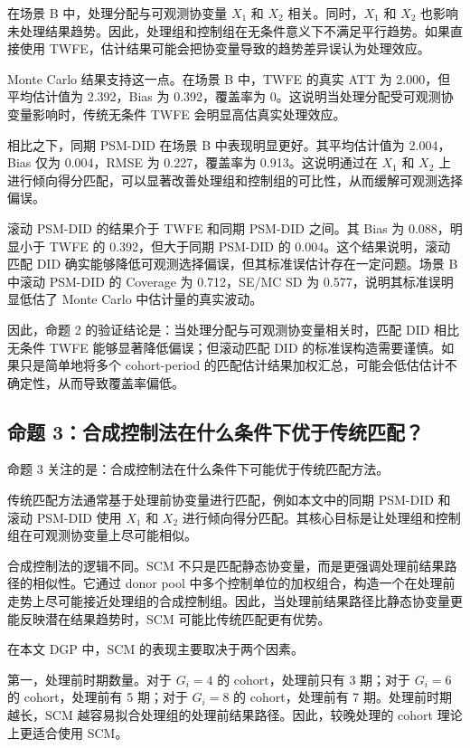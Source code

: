 \documentclass[
  fontset=windows]{ctexart}
\begin{document}
在场景 B 中，处理分配与可观测协变量 \(X_1\) 和 \(X_2\)
相关。同时，\(X_1\) 和 \(X_2\)
也影响未处理结果趋势。因此，处理组和控制组在无条件意义下不满足平行趋势。如果直接使用
TWFE，估计结果可能会把协变量导致的趋势差异误认为处理效应。

Monte Carlo 结果支持这一点。在场景 B 中，TWFE 的真实 ATT 为
2.000，但平均估计值为 2.392，Bias 为 0.392，覆盖率为
0。这说明当处理分配受可观测协变量影响时，传统无条件 TWFE
会明显高估真实处理效应。

相比之下，同期 PSM-DID 在场景 B 中表现明显更好。其平均估计值为
2.004，Bias 仅为 0.004，RMSE 为 0.227，覆盖率为 0.913。这说明通过在
\(X_1\) 和 \(X_2\)
上进行倾向得分匹配，可以显著改善处理组和控制组的可比性，从而缓解可观测选择偏误。

滚动 PSM-DID 的结果介于 TWFE 和同期 PSM-DID 之间。其 Bias 为
0.088，明显小于 TWFE 的 0.392，但大于同期 PSM-DID 的
0.004。这个结果说明，滚动匹配 DID
确实能够降低可观测选择偏误，但其标准误估计存在一定问题。场景 B 中滚动
PSM-DID 的 Coverage 为 0.712，SE/MC SD 为 0.577，说明其标准误明显低估了
Monte Carlo 中估计量的真实波动。

因此，命题 2 的验证结论是：当处理分配与可观测协变量相关时，匹配 DID
相比无条件 TWFE 能够显著降低偏误；但滚动匹配 DID
的标准误构造需要谨慎。如果只是简单地将多个 cohort-period
的匹配估计结果加权汇总，可能会低估估计不确定性，从而导致覆盖率偏低。

\subsection{命题
3：合成控制法在什么条件下优于传统匹配？}\label{ux547dux9898-3ux5408ux6210ux63a7ux5236ux6cd5ux5728ux4ec0ux4e48ux6761ux4ef6ux4e0bux4f18ux4e8eux4f20ux7edfux5339ux914d}

命题 3 关注的是：合成控制法在什么条件下可能优于传统匹配方法。

传统匹配方法通常基于处理前协变量进行匹配，例如本文中的同期 PSM-DID
和滚动 PSM-DID 使用 \(X_1\) 和 \(X_2\)
进行倾向得分匹配。其核心目标是让处理组和控制组在可观测协变量上尽可能相似。

合成控制法的逻辑不同。SCM
不只是匹配静态协变量，而是更强调处理前结果路径的相似性。它通过 donor
pool
中多个控制单位的加权组合，构造一个在处理前走势上尽可能接近处理组的合成控制组。因此，当处理前结果路径比静态协变量更能反映潜在结果趋势时，SCM
可能比传统匹配更有优势。

在本文 DGP 中，SCM 的表现主要取决于两个因素。

第一，处理前时期数量。对于 \(G_i=4\) 的 cohort，处理前只有 3 期；对于
\(G_i=6\) 的 cohort，处理前有 5 期；对于 \(G_i=8\) 的 cohort，处理前有 7
期。处理前时期越长，SCM
越容易拟合处理组的处理前结果路径。因此，较晚处理的 cohort
理论上更适合使用 SCM。
\end{document}
